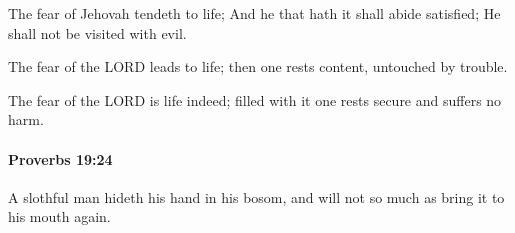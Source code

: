 			\begin{versebox}
					\item[BHS] 
					\item[ASV] The fear of Jehovah tendeth to life; And he that hath it shall abide satisfied; He shall not be visited with evil.
					\item[NIV] The fear of the LORD leads to life; then one rests content, untouched by trouble.
					\item[NRSV] The fear of the LORD is life indeed; filled with it one rests secure and suffers no harm.
			\end{versebox}

		\paragraph{Proverbs 19:24} %
			\label{PROVERBS-19-24}

			A slothful man hideth his hand in his bosom, and will not so much as bring it to his mouth again.

